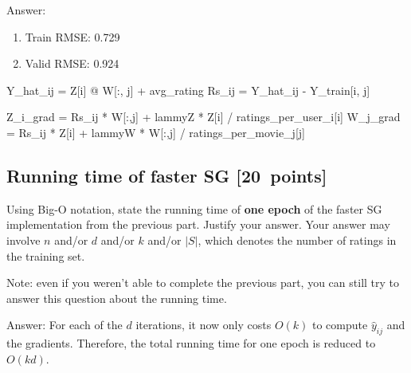 \documentclass{article}
\newcommand{\blu}[1]{{\textcolor{blu}{#1}}}
\newenvironment{answer}{\par\begingroup\color{gre}Answer: }{\endgroup}
\let\ask\blu
\newcommand\pts[1]{\textcolor{pointscolour}{[#1~points]}}
\begin{document}
\begin{answer}
    \begin{enumerate}
        \item Train RMSE: 0.729
        \item Valid RMSE: 0.924
    \end{enumerate}
\end{answer}
\vspace{1em}

\begin{python}
Y_hat_ij = Z[i] @ W[:, j] + avg_rating
Rs_ij = Y_hat_ij - Y_train[i, j]

Z_i_grad = Rs_ij * W[:,j] + lammyZ * Z[i] / ratings_per_user_i[i]
W_j_grad = Rs_ij * Z[i] + lammyW * W[:,j] / ratings_per_movie_j[j]
\end{python}


\clearpage
\subsection{Running time of faster SG \pts{20}}

\ask{Using Big-O notation, state the running time of \textbf{one epoch} of the faster SG implementation from the previous part. Justify your answer.} Your answer may involve $n$ and/or $d$ and/or $k$ and/or $|S|$, which denotes the number of ratings in the training set.

Note: even if you weren't able to complete the previous part, you can still try to answer this question about the running time.


\begin{answer}
    For each of the $d$ iterations, it now only costs $O(k)$ to compute $\hat y_{ij}$ and the gradients.
    Therefore, the total running time for one epoch is reduced to $O(kd)$.
\end{answer}
\end{document}
